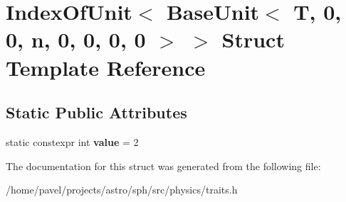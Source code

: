 \hypertarget{structIndexOfUnit_3_01BaseUnit_3_01T_00_010_00_010_00_01n_00_010_00_010_00_010_00_010_01_4_01_4}{}\section{Index\+Of\+Unit$<$ Base\+Unit$<$ T, 0, 0, n, 0, 0, 0, 0 $>$ $>$ Struct Template Reference}
\label{structIndexOfUnit_3_01BaseUnit_3_01T_00_010_00_010_00_01n_00_010_00_010_00_010_00_010_01_4_01_4}
\subsection*{Static Public Attributes}
\begin{DoxyCompactItemize}
\item 
\hypertarget{structIndexOfUnit_3_01BaseUnit_3_01T_00_010_00_010_00_01n_00_010_00_010_00_010_00_010_01_4_01_4_a2f040e1f8845529a384e27873d8bae09}{}\label{structIndexOfUnit_3_01BaseUnit_3_01T_00_010_00_010_00_01n_00_010_00_010_00_010_00_010_01_4_01_4_a2f040e1f8845529a384e27873d8bae09} 
static constexpr int {\bfseries value} = 2
\end{DoxyCompactItemize}


The documentation for this struct was generated from the following file\+:\begin{DoxyCompactItemize}
\item 
/home/pavel/projects/astro/sph/src/physics/traits.\+h\end{DoxyCompactItemize}
